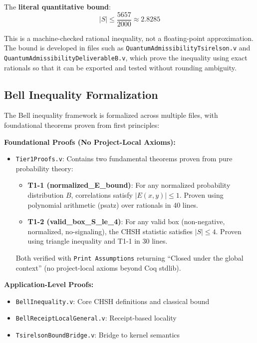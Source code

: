 The \textbf{literal quantitative bound}:
\begin{equation}
    |S| \le \frac{5657}{2000} \approx 2.8285
\end{equation}

This is a machine-checked rational inequality, not a floating-point approximation.
The bound is developed in files such as \texttt{QuantumAdmissibilityTsirelson.v} and \texttt{QuantumAdmissibilityDeliverableB.v}, which prove the inequality using exact rationals so that it can be exported and tested without rounding ambiguity.

\subsection{Bell Inequality Formalization}

The Bell inequality framework is formalized across multiple files, with foundational theorems proven from first principles:

\textbf{Foundational Proofs (No Project-Local Axioms):}
\begin{itemize}
    \item \texttt{Tier1Proofs.v}: Contains two fundamental theorems proven from pure probability theory:
    \begin{itemize}
        \item \textbf{T1-1 (normalized\_E\_bound)}: For any normalized probability distribution $B$, correlations satisfy $|E(x,y)| \leq 1$. Proven using polynomial arithmetic (psatz) over rationals in 40 lines.
        \item \textbf{T1-2 (valid\_box\_S\_le\_4)}: For any valid box (non-negative, normalized, no-signaling), the CHSH statistic satisfies $|S| \leq 4$. Proven using triangle inequality and T1-1 in 30 lines.
    \end{itemize}
    Both verified with \texttt{Print Assumptions} returning ``Closed under the global context'' (no project-local axioms beyond Coq stdlib).
\end{itemize}

\textbf{Application-Level Proofs:}
\begin{itemize}
    \item \texttt{BellInequality.v}: Core CHSH definitions and classical bound
    \item \texttt{BellReceiptLocalGeneral.v}: Receipt-based locality
    \item \texttt{TsirelsonBoundBridge.v}: Bridge to kernel semantics
\end{itemize}

